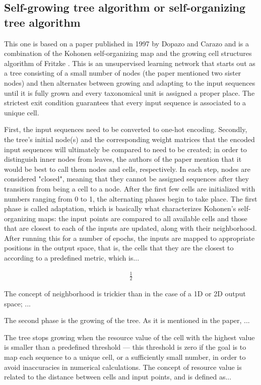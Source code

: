\documentclass[11pt,twocolumn]{article}
\begin{document}
\subsection*{Self-growing tree algorithm or self-organizing tree algorithm}

This one is based on a paper published in 1997 by Dopazo and Carazo \cite{Dopazo1997} and is a combination of the Kohonen self-organizing map \cite{58325} and the growing cell structures algorithm of Fritzke \cite{Fritzke1994}. This is an unsupervised learning network that starts out as a tree consisting of a small number of nodes (the paper mentioned two sister nodes) and then alternates between growing and adapting to the input sequences until it is fully grown and every taxonomical unit is assigned a proper place. The strictest exit condition guarantees that every input sequence is associated to a unique cell.

First, the input sequences need to be converted to one-hot encoding. Secondly, the tree's initial node(s) and the corresponding weight matrices that the encoded input sequences will ultimately be compared to need to be created; in order to distinguish inner nodes from leaves, the authors of the paper mention that it would be best to call them nodes and cells, respectively. In each step, nodes are considered "closed", meaning that they cannot be assigned sequences after they transition from being a cell to a node. After the first few cells are initialized with numbers ranging from 0 to 1, the alternating phases begin to take place. The first phase is called adaptation, which is basically what characterizes Kohonen's self-organizing maps: the input points are compared to all available cells and those that are closest to each of the inputs are updated, along with their neighborhood. After running this for a number of epochs, the inputs are mapped to appropriate positions in the output space, that is, the cells that they are the closest to according to a predefined metric, which is...

\begin{align}
\frac{1}{2}
\end{align}

The concept of neighborhood is trickier than in the case of a 1D or 2D output space; ...

The second phase is the growing of the tree. As it is mentioned in the paper, ...

The tree stops growing when the resource value of the cell with the highest value is smaller than a predefined threshold — this threshold is zero if the goal is to map each sequence to a unique cell, or a sufficiently small number, in order to avoid inaccuracies in numerical calculations. The concept of resource value is related to the distance between cells and input points, and is defined as...
\end{document}
